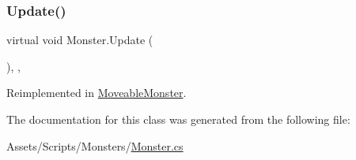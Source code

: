 \mbox{\label{class_monster_a91c04bb8ad53b26283de5f5bab20b789}} 
\subsubsection{\texorpdfstring{Update()}{Update()}}
{\footnotesize\ttfamily virtual void Monster.\+Update (\begin{DoxyParamCaption}{ }\end{DoxyParamCaption})\hspace{0.3cm}{\ttfamily [inline]}, {\ttfamily [protected]}, {\ttfamily [virtual]}}



Reimplemented in \mbox{\hyperlink{class_moveable_monster_a03035ace68ce00f475ba1ef194ef5595}{Moveable\+Monster}}.



The documentation for this class was generated from the following file\+:\begin{DoxyCompactItemize}
\item 
Assets/\+Scripts/\+Monsters/\mbox{\hyperlink{_monster_8cs}{Monster.\+cs}}\end{DoxyCompactItemize}
